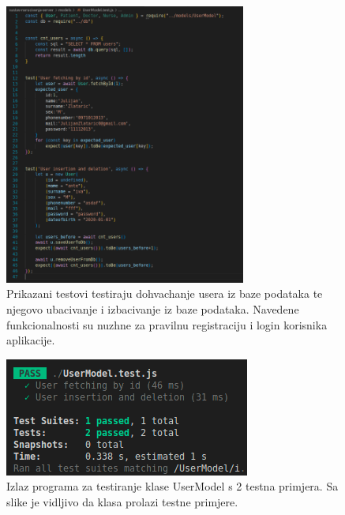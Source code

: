             \begin{figure}[H]
                    \includegraphics[width=300]{slike/usermodel_tests_code.png} %
                    \caption{Prikazani testovi testiraju dohvachanje usera iz baze podataka te njegovo ubacivanje i izbacivanje iz baze podataka. Navedene funkcionalnosti su nuzhne za pravilnu registraciju i login korisnika aplikacije.}
                    \label{fig:struktura} %
                \end{figure}

                \begin{figure}[H]
                    \includegraphics[width=\textwidth]{slike/usermodel_tests_out.png} %
                    \caption{Izlaz programa za testiranje klase UserModel s 2 testna primjera. Sa slike je vidljivo da klasa prolazi testne primjere.}
                    \label{fig:struktura} %
                \end{figure}

